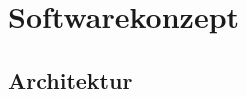 \chapter{Softwarekonzept} \label{chap:softwarekonzept}

\section{Architektur} \label{sec:architektur}